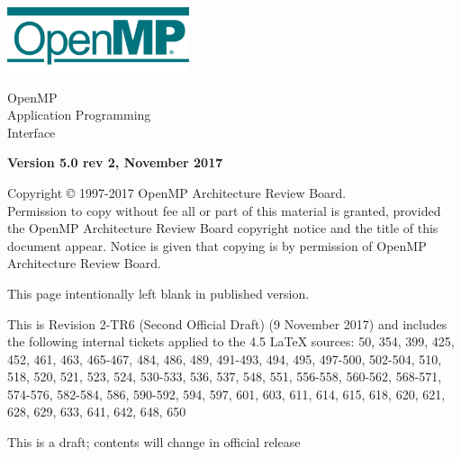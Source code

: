 
  \begin{titlepage}
    \begin{flushleft}
     \hspace{-6em} \includegraphics[width=0.4\textwidth]{openmp-logo.png}
    \end{flushleft}

    \begin{adjustwidth}{-0.75in}{0in}
    \begin{center}
      \Huge
      \textsf{OpenMP\\Application Programming\\Interface}

      \vspace{0.5in}\textsf{    }\vspace{-0.7in}
      \normalsize

      \vspace{1.0in}

      \textbf{Version 5.0 rev 2, November 2017}
    \end{center}
    \end{adjustwidth}

    \vspace{3.0in}

\begin{adjustwidth}{0pt}{1em}\setlength{\parskip}{0.25\baselineskip}%
Copyright © 1997-2017 OpenMP Architecture Review Board.\\
Permission to copy without fee all or part of this material is granted,
provided the OpenMP Architecture Review Board copyright notice and
the title of this document appear. Notice is given that copying is by
permission of OpenMP Architecture Review Board.\end{adjustwidth}

  \end{titlepage}


\clearpage
\thispagestyle{empty}
\phantom{a}
This page intentionally left blank in published version.

This is Revision 2-TR6 (Second Official Draft) (9 November 2017) and 
includes the following internal tickets applied to the 4.5 LaTeX sources: 
50, 354, 399, 425, 452, 461, 463, 465-467, 484, 486, 489, 491-493, 494, 
495, 497-500, 502-504, 510, 518, 520, 521, 523, 524, 530-533, 536, 537, 
548, 551, 556-558, 560-562, 568-571, 574-576, 582-584, 586, 590-592, 594, 
597, 601, 603, 611, 614, 615, 618, 620, 621, 628, 629, 633, 641, 642, 
648, 650

This is a draft; contents will change in official release

\vfill

